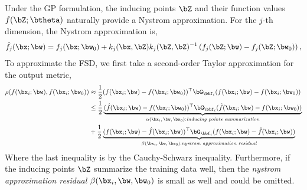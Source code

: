 Under the GP formulation, the inducing points $\bZ$ and their function values $f(\bZ; \btheta)$ naturally provide a Nystrom approximation. For the $j$-th dimension, the Nystrom approximation is,
\begin{align}
    \hat{f}_j(\bx; \bw) =  f_j(\bx; \bw_0) + k_j(\bx, \bZ)k_j(\bZ, \bZ)^{-1} \left( f_j(\bZ; \bw) - f_j(\bZ; \bw_0) \right),
\end{align}
To approximate the FSD, we first take a second-order Taylor approximation for the output metric,
\begin{align}
    \rho(f(\bx_i; \bw), f(\bx_i; \bw_0)) 
    &\approx\frac{1}{2}(f(\bx_i; \bw) - f(\bx_i; \bw_0))^{\top} \bG_{\bbf_i} (f(\bx_i; \bw) - f(\bx_i; \bw_0)) \notag \\
    &\leq  \frac{1}{2}\underbrace{ (\hat{f}(\bx_i; \bw) - f(\bx_i; \bw_0))^{\top} \bG_{\bbf_i} (\hat{f}(\bx_i; \bw) - f(\bx_i; \bw_0))}_{\text{$\alpha(\bx_i, \bw, \bw_0)$:\emph{inducing points summarization}}} \notag \\
    & + \frac{1}{2} \underbrace{ (f(\bx_i; \bw) - \hat{f}(\bx_i; \bw))^{\top} \bG_{\bbf_i} (f(\bx_i; \bw) - \hat{f}(\bx_i; \bw)) }_{\text{$\beta(\bx_i, \bw, \bw_0) $:\emph{nystrom approximation residual}}}
\end{align}
Where the last inequality is by the Cauchy-Schwarz inequality. Furthermore, if the inducing points $\bZ$ summarize the training data well, then the \emph{nystrom approximation residual} $\beta(\bx_i, \bw, \bw_0)$ is small as well and could be omitted.

